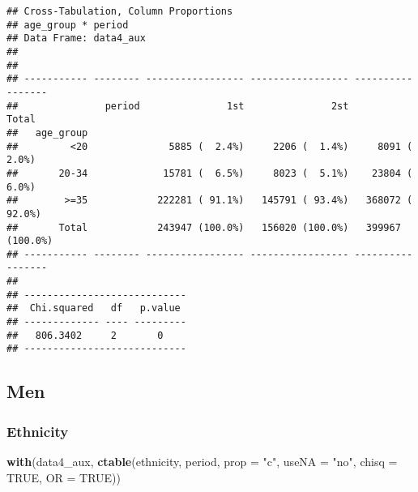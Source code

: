 \documentclass[
]{article}
\newenvironment{Shaded}{\begin{snugshade}}{\end{snugshade}}
\newcommand{\DataTypeTok}[1]{\textcolor[rgb]{0.13,0.29,0.53}{#1}}
\newcommand{\KeywordTok}[1]{\textcolor[rgb]{0.13,0.29,0.53}{\textbf{#1}}}
\newcommand{\NormalTok}[1]{#1}
\newcommand{\OperatorTok}[1]{\textcolor[rgb]{0.81,0.36,0.00}{\textbf{#1}}}
\newcommand{\OtherTok}[1]{\textcolor[rgb]{0.56,0.35,0.01}{#1}}
\newcommand{\StringTok}[1]{\textcolor[rgb]{0.31,0.60,0.02}{#1}}
\begin{document}
\begin{verbatim}
## Cross-Tabulation, Column Proportions  
## age_group * period  
## Data Frame: data4_aux  
## 
## 
## ----------- -------- ----------------- ----------------- -----------------
##               period               1st               2st             Total
##   age_group                                                               
##         <20              5885 (  2.4%)     2206 (  1.4%)     8091 (  2.0%)
##       20-34             15781 (  6.5%)     8023 (  5.1%)    23804 (  6.0%)
##        >=35            222281 ( 91.1%)   145791 ( 93.4%)   368072 ( 92.0%)
##       Total            243947 (100.0%)   156020 (100.0%)   399967 (100.0%)
## ----------- -------- ----------------- ----------------- -----------------
## 
## ----------------------------
##  Chi.squared   df   p.value 
## ------------- ---- ---------
##   806.3402     2       0    
## ----------------------------
\end{verbatim}

\hypertarget{men}{%
\subsection{Men}\label{men}}

\begin{Shaded}
\end{Shaded}

\hypertarget{ethnicity-1}{%
\subsubsection{Ethnicity}\label{ethnicity-1}}

\begin{Shaded}
\begin{Highlighting}[]
\KeywordTok{with}\NormalTok{(data4_aux, }\KeywordTok{ctable}\NormalTok{(ethnicity, period,  }\DataTypeTok{prop =} \StringTok{"c"}\NormalTok{, }\DataTypeTok{useNA =} \StringTok{"no"}\NormalTok{, }\DataTypeTok{chisq =} \OtherTok{TRUE}\NormalTok{, }\DataTypeTok{OR =} \OtherTok{TRUE}\NormalTok{))}
\end{Highlighting}
\end{Shaded}
\end{document}
